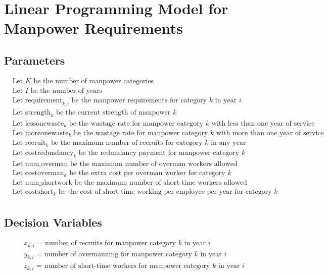 \documentclass{article}
\begin{document}
\section*{Linear Programming Model for Manpower Requirements}

\subsection*{Parameters}
\begin{align*}
& \text{Let } K \text{ be the number of manpower categories} \\
& \text{Let } I \text{ be the number of years} \\
& \text{Let } \text{requirement}_{k, i} \text{ be the manpower requirements for category } k \text{ in year } i \\
& \text{Let } \text{strength}_{k} \text{ be the current strength of manpower } k \\
& \text{Let } \text{lessonewaste}_{k} \text{ be the wastage rate for manpower category } k \text{ with less than one year of service} \\
& \text{Let } \text{moreonewaste}_{k} \text{ be the wastage rate for manpower category } k \text{ with more than one year of service} \\
& \text{Let } \text{recruit}_{k} \text{ be the maximum number of recruits for category } k \text{ in any year} \\
& \text{Let } \text{costredundancy}_{k} \text{ be the redundancy payment for manpower category } k \\
& \text{Let } \text{num\_overman} \text{ be the maximum number of overman workers allowed} \\
& \text{Let } \text{costoverman}_{k} \text{ be the extra cost per overman worker for category } k \\
& \text{Let } \text{num\_shortwork} \text{ be the maximum number of short-time workers allowed} \\
& \text{Let } \text{costshort}_{k} \text{ be the cost of short-time working per employee per year for category } k \\
\end{align*}

\subsection*{Decision Variables}
\begin{align*}
& x_{k, i} \text{ = number of recruits for manpower category } k \text{ in year } i \\
& y_{k, i} \text{ = number of overmanning for manpower category } k \text{ in year } i \\
& z_{k, i} \text{ = number of short-time workers for manpower category } k \text{ in year } i \\
\end{align*}
\end{document}
